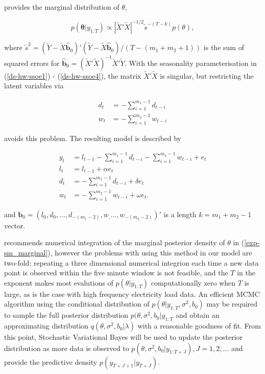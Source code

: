 \documentclass[12pt,a4paper]{article}%
\numberwithin{equation}{section}
\begin{document}
\citet{Forbes2000} provides the marginal distribution of $\theta$,

\begin{equation}
\label{exp-sm-marginal}
p(\boldsymbol{\theta} | y_{1:T}) \propto \left| \widetilde{X}' \widetilde{X} \right|^{-1/2} \tilde{s}^{-(T-k)} p(\theta),
\end{equation}

where $\tilde{s}^2 = (\widetilde{Y} - \widetilde{X}\hat{\boldsymbol{b}}_0)'(\widetilde{Y} - \widetilde{X}\hat{\boldsymbol{b}}_0) / (T - (m_1 + m_2 + 1))$ is the sum of squared errors for $\hat{\boldsymbol{b}}_0 = (\widetilde{X}'\widetilde{X})^{-1}\widetilde{X}'\widetilde{Y}$.
With the seasonality parameterisation in (\ref{ds-hw-ssoe1}) - (\ref{ds-hw-ssoe4}), the matrix $\widetilde{X}' \widetilde{X}$ is singular, but restricting the latent variables via

\begin{align}
d_t &= - \sum_{i=1}^{m_1-1} d_{t-i} \\
w_t &= - \sum_{i=1}^{m_2-1} w_{t-i}
\end{align}

avoids this problem. The resulting model is described by

\begin{align}
y_t &= l_{t-1} - \sum_{i = 1}^{m_1 - 1}d_{t-i} - \sum_{i = 1}^{m_2 - 1}w_{t-i} + e_t \label{ds-hw-rp1} \\
l_t &= l_{t-1} + \alpha e_t \label{ds-hw-rp2} \\
d_t &= - \sum_{i = 1}^{m_1 - 1}d_{t-i} + \delta e_t \label{ds-hw-rp3} \\
w_t &= - \sum_{i = 1}^{m_2 - 1}w_{t-i} + \omega e_t \label{ds-hw-rp4}.
\end{align}

and $\boldsymbol{b}_0 = (l_0, d_0, \dots, d_{-(m_1 - 2)}, w_, \dots, w_{-(m_2 - 2)})'$ is a length $k = m_1 + m_2 - 1$ vector.

\citet{Forbes2000} recommends numerical integration of the marginal posterior density of $\theta$ in (\ref{exp-sm_marginal}), however the problems with using this method in our model are two-fold: repeating a three dimensional numerical integrion each time a new data point is observed within the five minute window is not feasible, and the $T$ in the exponent makes most evalutions of $p(\theta | y_{1:T})$ computationally zero when $T$ is large, as is the case with high frequency electricity load data. An efficient MCMC algorithm using the conditional distribution of $p(\theta | y_{1:T}, \sigma^2, b_0)$ may be required to sample the full posterior distribution $p(\theta, \sigma^2, b_0 | y_{1:T}$ and obtain an approximating distribution $q(\theta, \sigma^2, b_0 | \lambda)$ with a reasonable goodness of fit. From this point, Stochastic Variational Bayes will be used to update the posterior distribution as more data is observed to $p(\theta, \sigma^2, b_0 | y_{1:T+J}), J = 1, 2, \dots$ and provide the predictive density $p(y_{T+J+1} | y_{T+J})$.
\end{document}
